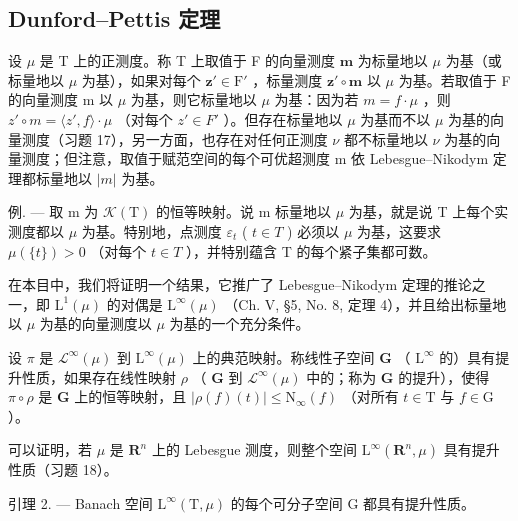 \subsection{Dunford--Pettis 定理}

设 \(\mu\) 是 T 上的正测度。称 T 上取值于 F 的向量测度 \(\mathbf{m}\) 为标量地以 \(\mu\) 为基（或标量地以 \(\mu\) 为基），如果对每个 \(\mathbf{z}' \in \mathrm{F}'\) ，标量测度 \(\mathbf{z}' \circ \mathbf{m}\) 以 \(\mu\) 为基。若取值于 F 的向量测度 m 以 \(\mu\) 为基，则它标量地以 \(\mu\) 为基：因为若 \(m = f \cdot \mu\) ，则 \(z' \circ m = \langle z', f \rangle \cdot \mu\) （对每个 \(z' \in F'\) ）。但存在标量地以 \(\mu\) 为基而不以 \(\mu\) 为基的向量测度（习题 17），另一方面，也存在对任何正测度 \(\nu\) 都不标量地以 \(\nu\) 为基的向量测度；但注意，取值于赋范空间的每个可优超测度 m 依 Lebesgue--Nikodym 定理都标量地以 \(|m|\) 为基。

例. --- 取 m 为 \(\mathcal{K}(\mathrm{T})\) 的恒等映射。说 m 标量地以 \(\mu\) 为基，就是说 T 上每个实测度都以 \(\mu\) 为基。特别地，点测度 \(\varepsilon_{t}\) ( \(t \in T\) ) 必须以 \(\mu\) 为基，这要求 \(\mu(\{t\}) > 0\) （对每个 \(t \in T\) ），并特别蕴含 T 的每个紧子集都可数。

在本目中，我们将证明一个结果，它推广了 Lebesgue--Nikodym 定理的推论之一，即 \(\mathrm{L}^{1}(\mu)\) 的对偶是 \(\mathrm{L}^{\infty}(\mu)\) （Ch. V, §5, No. 8, 定理 4），并且给出标量地以 \(\mu\) 为基的向量测度以 \(\mu\) 为基的一个充分条件。

设 \(\pi\) 是 \(\mathcal{L}^{\infty}(\mu)\) 到 \(\mathrm{L}^{\infty}(\mu)\) 上的典范映射。称线性子空间 \(\mathbf{G}\) （ \(\mathrm{L}^{\infty}\) 的）具有提升性质，如果存在线性映射 \(\rho\) （ \(\mathbf{G}\) 到 \(\mathcal{L}^{\infty}(\mu)\) 中的；称为 \(\mathbf{G}\) 的提升），使得 \(\pi \circ \rho\) 是 \(\mathbf{G}\) 上的恒等映射，且 \(|\rho(f)(t)| \leqslant \mathrm{N}_{\infty}(f)\) （对所有 \(t \in \mathrm{T}\) 与 \(f \in \mathrm{G}\) ）。

可以证明，若 \(\mu\) 是 \(\mathbf{R}^n\) 上的 Lebesgue 测度，则整个空间 \(\mathrm{L}^{\infty}(\mathbf{R}^{n},\mu)\) 具有提升性质（习题 18）。

引理 2. --- Banach 空间 \(\mathrm{L}^{\infty}(\mathrm{T},\mu)\) 的每个可分子空间 G 都具有提升性质。

